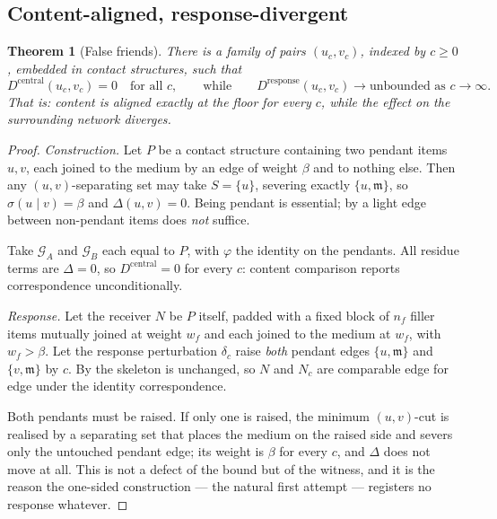 \documentclass[11pt,twocolumn,a4paper]{article}
\theoremstyle{plain}
\newtheorem{theorem}{Theorem}[section]
\theoremstyle{definition}
\theoremstyle{remark}
\newcommand{\flo}{\beta}                       %
\newcommand{\sep}{\sigma}                      %
\newcommand{\med}{\mathfrak{m}}                %
\newcommand{\Gph}{\mathcal{G}}
\newcommand{\dem}{D}
\newcommand{\corr}{\varphi}
\begin{document}
\subsection{Content-aligned, response-divergent}

\begin{theorem}[False friends]
\label{thm:falsefriend}
There is a family of pairs $(u_c,v_c)$, indexed by $c\ge0$, embedded in
contact structures, such that
\[
  \dem^{\mathrm{central}}(u_c,v_c)=0 \quad\text{for all } c,
  \qquad\text{while}\qquad
  \dem^{\mathrm{response}}(u_c,v_c)\longrightarrow \text{unbounded as } c\to\infty .
\]
That is: content is aligned exactly at the floor for every $c$, while
the effect on the surrounding network diverges.
\end{theorem}

\begin{proof}
\emph{Construction.} Let $P$ be a contact structure containing two
pendant items $u,v$, each joined to the medium by an edge of weight
$\flo$ and to nothing else. Then any $(u,v)$-separating set may take
$S=\{u\}$, severing exactly $\{u,\med\}$, so
$\sep(u\mid v)=\flo$ and $\Delta(u,v)=0$. Being pendant is essential;
by  a light edge between non-pendant items does
\emph{not} suffice.

Take $\Gph_A$ and $\Gph_B$ each equal to $P$, with $\corr$ the identity
on the pendants. All residue terms are $\Delta=0$, so
$\dem^{\mathrm{central}}=0$ for every $c$: content comparison reports
correspondence unconditionally.

\emph{Response.} Let the receiver $N$ be $P$ itself, padded with a fixed
block of $n_f$ filler items mutually joined at weight $w_f$ and each
joined to the medium at $w_f$, with $w_f>\flo$. Let the response
perturbation $\delta_c$ raise \emph{both} pendant edges
$\{u,\med\}$ and $\{v,\med\}$ by $c$. By  the
skeleton is unchanged, so $N$ and $N_c$ are comparable edge for edge
under the identity correspondence.

Both pendants must be raised. If only one is raised, the minimum
$(u,v)$-cut is realised by a separating set that places the medium on
the raised side and severs only the untouched pendant edge; its weight
is $\flo$ for every $c$, and $\Delta$ does not move at all. This is not
a defect of the bound but of the witness, and it is the reason the
one-sided construction --- the natural first attempt --- registers no
response whatever.


\end{proof}
\end{document}
